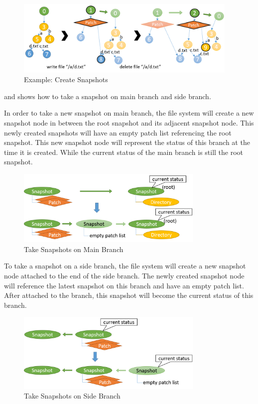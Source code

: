 \begin{figure}[hbtp]
\centering
\includegraphics[width=0.95\textwidth]{Chapter-4/figs/fig26.png}
\caption{Example: Create Snapshots}
\label{fig:create_snapshots}
\end{figure}

     and  shows how to take a snapshot on main branch and side branch.

    In order to take a new snapshot on main branch, the file system will create a new snapshot node in between the root snapshot and its adjacent snapshot node. This newly created snapshots will have an empty patch list referencing the root snapshot. This new snapshot node will represent the status of this branch at the time it is created. While the current status of the main branch is still the root snapshot.

\begin{figure}[hbtp]
\centering
\includegraphics[width=0.8\textwidth]{Chapter-4/figs/fig20.png}
\caption{Take Snapshots on Main Branch}
\label{fig:take_snapshot_root}
\end{figure}
    
	To take a snapshot on a side branch, the file system will create a new snapshot node attached to the end of the side branch. The newly created snapshot node will reference the latest snapshot on this branch and have an empty patch list. After attached to the branch, this snapshot will become the current status of this branch.

\begin{figure}[hbtp]
\centering
\includegraphics[width=0.8\textwidth]{Chapter-4/figs/fig21.png}
\caption{Take Snapshots on Side Branch}
\label{fig:take_snapshot_nonroot}
\end{figure}
    

